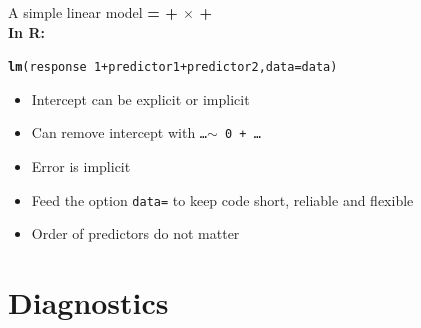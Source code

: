 \documentclass[10pt]{beamer}\usepackage[]{graphicx}\usepackage[]{color}
\makeatletter
\newcommand{\hlnum}[1]{\textcolor[rgb]{0.686,0.059,0.569}{#1}}%
\newcommand{\hlopt}[1]{\textcolor[rgb]{0,0,0}{#1}}%
\newcommand{\hlstd}[1]{\textcolor[rgb]{0.345,0.345,0.345}{#1}}%
\newcommand{\hlkwc}[1]{\textcolor[rgb]{0.333,0.667,0.333}{#1}}%
\newcommand{\hlkwd}[1]{\textcolor[rgb]{0.737,0.353,0.396}{\textbf{#1}}}%
\newenvironment{kframe}{%
 \def\at@end@of@kframe{}%
 \ifinner\ifhmode%
  \def\at@end@of@kframe{\end{minipage}}%
  \begin{minipage}{\columnwidth}%
 \fi\fi%
 \def\FrameCommand##1{\hskip\@totalleftmargin \hskip-\fboxsep
 \colorbox{shadecolor}{##1}\hskip-\fboxsep
     \hskip-\linewidth \hskip-\@totalleftmargin \hskip\columnwidth}%
 \MakeFramed {\advance\hsize-\width
   \@totalleftmargin\z@ \linewidth\hsize
   \@setminipage}}%
 {\par\unskip\endMakeFramed%
 \at@end@of@kframe}
\newenvironment{knitrout}{}{} %
\makeatother
\begin{document}
\begin{frame}[fragile]{A simple linear model}
  \textbf{{\color{purple}{Response}} = {\color{blue}{Intercept}} + {\color{red}{Slope}} $\times$ {\color{orange}{Predictor}} + {\color{gray}{Error}}} \\
  \vspace{1cm}
\textbf{In R:}
\begin{knitrout}\small
{}\color{fgcolor}\begin{kframe}
\begin{alltt}
  \hlkwd{lm}\hlstd{(response} \hlopt{~} \hlnum{1} \hlopt{+} \hlstd{predictor1} \hlopt{+} \hlstd{predictor2,} \hlkwc{data}\hlstd{=data)}
\end{alltt}
\end{kframe}
\end{knitrout}
\begin{itemize}
  \item Intercept can be explicit or implicit
  \item Can remove intercept with \texttt{\dots $\sim $ 0 + \dots}
  \item Error is implicit
  \item Feed the option \texttt{data=} to keep code short, reliable and flexible
  \item Order of predictors do not matter 
\end{itemize}

\end{frame}

\section{Diagnostics}
\end{document}
